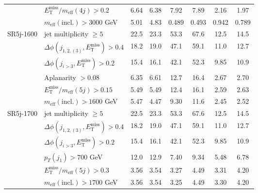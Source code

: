 \documentclass[10pt,fleqn]{article}
\newcommand{\met}{E^\mathrm{miss}_\mathrm{T}}
\newcommand{\meff}{m_\mathrm{eff}}
\begin{document}
\begin{table}[h!]
\begin{tabular}{c|l|c|c|c|c|c|c}
             & $\met/\meff(4j) > 0.2$                          &     6.64   &   6.38    &  7.92      &   7.89    &      2.16    &   1.97         \\    
             & $\meff(\mathrm{incl.}) > 3000$ GeV              &     5.01   &   4.83    &  0.489     &   0.493   &      0.942   &   0.789        \\ \midrule          
SR5j-1600    & jet multiplicity $\geq 5$                       &     22.5   &   23.3    &  53.3      &   67.6    &      12.5    &   14.5         \\
             & $\Delta\phi(j_{1,2,(3)},\met) > 0.4$            &     18.2   &   19.0    &  47.1      &   59.1    &      11.0    &   12.7         \\
             & $\Delta\phi(j_{i>3},\met) > 0.2$                &     15.4   &   16.1    &  42.1      &   52.3    &      9.85    &   10.9         \\      
             & Aplanarity $> 0.08$                             &     6.35   &   6.61    &  12.7      &   16.4    &      2.67    &   2.70         \\           
             & $\met/\meff(5j) > 0.15$                         &     5.49   &   5.49    &  12.4      &   16.1    &      2.59    &   2.63         \\    
             & $\meff(\mathrm{incl.}) > 1600$ GeV              &     5.47   &   4.47    &  9.30      &   11.6    &      2.45    &   2.52         \\ \midrule       
SR5j-1700    & jet multiplicity $\geq 5$                       &     22.5   &   23.3    &  53.3      &   67.6    &      12.5    &   14.5         \\
             & $\Delta\phi(j_{1,2,(3)},\met) > 0.4$            &     18.2   &   19.0    &  47.1      &   59.1    &      11.0    &   12.7         \\
             & $\Delta\phi(j_{i>3},\met) > 0.2$                &     15.4   &   16.1    &  42.1      &   52.3    &      9.85    &   10.9         \\      
             & $p_T(j_1) > 700$ GeV                            &     12.0   &   12.9    &  7.40      &   9.34    &      5.48    &   6.78         \\           
             & $\met/\meff(5j) > 0.3$                          &     3.56   &   3.54    &  3.27      &   4.49    &      3.31    &   4.20         \\    
             & $\meff(\mathrm{incl.}) > 1700$ GeV              &     3.56   &   3.54    &  3.25      &   4.49    &      3.30    &   4.20         \\ \midrule   

\end{tabular}
\end{table}
\end{document}
